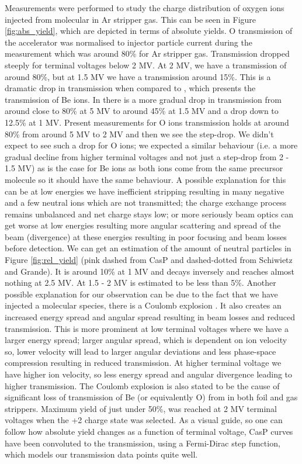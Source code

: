 \documentclass[a4paper,fleqn,review]{cas-sc}
\begin{document}
Measurements were performed to study the charge distribution of oxygen ions injected from molecular  in Ar stripper gas. This can be seen in Figure \ref{fig:abs_yield}, which are depicted in terms of absolute yields. O transmission of the accelerator was normalised to injector particle current during the measurement which was around 80\% for Ar stripper gas. Transmission dropped steeply for terminal voltages below 2 MV. At 2 MV, we have a transmission of around 80\%, but at 1.5 MV we have a transmission around 15\%. This is a dramatic drop in transmission when compared to \cite{gonsalves2020charge}, which presents the transmission of Be ions. In \cite{gonsalves2020charge} there is a more gradual drop in transmission from around close to 80\% at 5 MV to around 45\% at 1.5 MV and a drop down to 12.5\% at 1 MV. Present measurements for O  ions transmission holds at around 80\% from around 5 MV to 2 MV and then we see the step-drop. We didn't expect to see such a drop for O ions; we expected a similar behaviour (i.e. a more gradual decline from higher terminal voltages and not just a step-drop from 2 - 1.5 MV) as is the case for Be ions as both ions come from the same precursor molecule so it should have the same behaviour. A possible explanation for this can be \cite{meena2025analysing} at low energies we have inefficient stripping resulting in many negative and a few neutral ions which are not transmitted; the charge exchange process remains unbalanced and net charge stays low; or more seriously beam optics can get worse at low energies resulting more angular scattering and spread of the beam (divergence) at these energies resulting in poor focusing and beam losses before detection. We can get an estimation of the amount of neutral particles in Figure \ref{fig:rel_yield} (pink dashed from CasP and dashed-dotted from Schiwietz and Grande). It is around 10\% at 1 MV and decays inversely and reaches almost nothing at 2.5 MV. At 1.5 - 2 MV is estimated to be less than 5\%. Another possible explanation for our observation can be due to the fact that we have injected a molecular species, there is a Coulomb explosion \cite{suter2022impact}. It also creates an increased energy spread and angular spread resulting in beam losses and reduced transmission. This is more prominent at low terminal voltages where we have a larger energy spread; larger angular spread, which is dependent on ion velocity so, lower velocity will lead to larger angular deviations and less phase-space compression resulting in reduced transmission. At higher terminal voltage we have higher ion velocity, so less energy spread and angular divergence leading to higher transmission. The Coulomb explosion is also stated \cite{fifield2023coulomb} to be the cause of significant loss of transmission of  Be (or equivalently O) from  in both foil and gas strippers.  Maximum yield of just under 50\%, was reached at 2 MV terminal voltages when the +2 charge state was selected. As a visual guide, so one can follow how  absolute yield changes as a function of terminal voltage, CasP curves have been convoluted to the transmission, using a Fermi-Dirac step function, which models our transmission data points quite well. 
\end{document}
